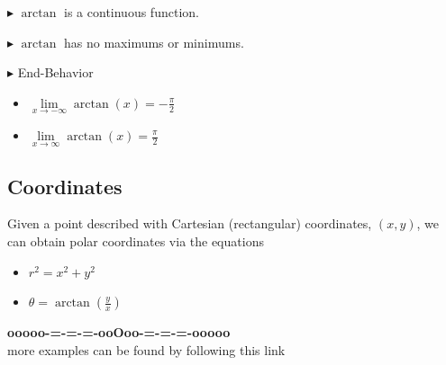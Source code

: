 \documentclass{ximera}
\begin{document}
$\blacktriangleright$ $\arctan$ is a continuous function.

$\blacktriangleright$ $\arctan$ has no maximums or minimums.


$\blacktriangleright$ End-Behavior





\begin{itemize}
  \item $\lim\limits_{x \to -\infty} \arctan(x) = -\frac{\pi}{2}$
  \item $\lim\limits_{x \to \infty} \arctan(x) = \frac{\pi}{2}$
\end{itemize}










\subsection*{Coordinates} 

Given a point described with Cartesian (rectangular) coordinates, $(x, y)$, we can obtain polar coordinates via the equations


\begin{itemize}
\item $r^2 = x^2 + y^2$
\item $\theta = \arctan\left( \frac{y}{x} \right)$
\end{itemize}












\begin{center}
\textbf{\textcolor{green!50!black}{ooooo-=-=-=-ooOoo-=-=-=-ooooo}} \\

more examples can be found by following this link\\ 

\end{center}
\end{document}
